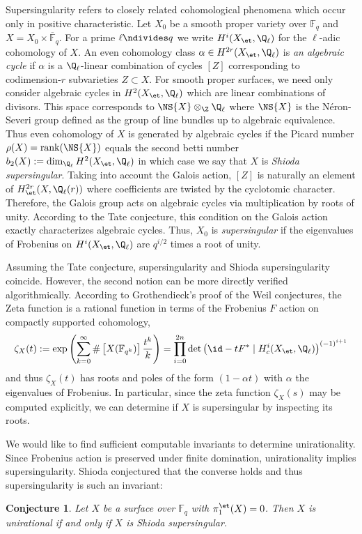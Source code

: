 \documentclass[11pt]{amsart}
\newtheorem*{conj}{Conjecture}
\begin{document}
Supersingularity refers to closely related cohomological phenomena which occur only in positive characteristic. Let $X_0$ be a smooth proper variety over $\mathbb{F}_q$ and $X = X_0 \times \overline{\mathbb{F}}_q$. For a prime $\ell \ndivides q$ we write $H^{i}(X_{\et}, \Q_\ell)$ for the $\ell$-adic \etale cohomology of $X$. An even cohomology class $\alpha \in H^{2r}(X_{\et}, \Q_\ell)$ is \textit{an algebraic cycle} if $\alpha$ is a $\Q_\ell$-linear combination of cycles $[Z]$ corresponding to codimension-$r$ subvarieties $Z \subset X$. For smooth proper surfaces, we need only consider algebraic cycles in $H^2(X_{\et}, \Q_\ell)$ which are linear combinations of divisors. This space corresponds to $\NS{X} \otimes_\Z \Q_\ell$ where $\NS{X}$ is the N\'{e}ron-Severi group defined as the group of line bundles up to algebraic equivalence. Thus even cohomology of $X$ is generated by algebraic cycles if the Picard number $\rho(X) = \mathrm{rank}(\NS{X})$ equals the second betti number $b_2(X) := \dim_{\Q_\ell} H^2(X_{\et}, \Q_\ell)$ in which case we say that $X$ is \textit{Shioda supersingular}.
Taking into account the Galois action, $[Z]$ is naturally an element of $H^{2r}_{\et}(X, \Q_\ell(r))$ where coefficients are twisted by the cyclotomic character. Therefore, the Galois group acts on algebraic cycles via multiplication by roots of unity. According to the Tate conjecture, this condition on the Galois action exactly characterizes algebraic cycles. Thus, $X_0$ is \textit{supersingular} if the eigenvalues of Frobenius on $H^{i}(X_{\et}, \Q_\ell)$ are $q^{i/2}$ times a root of unity.
\par
Assuming the Tate conjecture, supersingularity and Shioda supersingularity coincide.
However, the second notion can be more directly verified algorithmically. According to Grothendieck's proof of the Weil conjectures, the Zeta function is a rational function in terms of the Frobenius $F$ action on compactly supported \etale cohomology,
\[ \zeta_X(t) := \exp{ \left( \sum_{k = 0}^\infty \# \left[ X(\mathbb{F}_{q^k}) \right] \frac{t^k}{k} \right)} = \prod_{i = 0}^{2n} \det{\left( \id - t F^* \mid H^{i}_c(X_{\et}, \Q_\ell) \right)}^{(-1)^{i + 1}} \]
and thus $\zeta_X(t)$ has roots and poles of the form $(1 - \alpha t)$ with $\alpha$ the eigenvalues of Frobenius. In particular, since the zeta function $\zeta_X(s)$ may be computed explicitly, we can determine if $X$ is supersingular by inspecting its roots.
\par
We would like to find sufficient computable invariants to determine unirationality. Since Frobenius action is preserved under finite domination, unirationality implies supersingularity. Shioda conjectured \cite{shioda_some_results} that the converse holds and thus supersingularity is such an invariant:
\begin{conj}
Let $X$ be a surface over $\mathbb{F}_q$ with $\pi_1^{\et}(X) = 0$. Then $X$ is unirational if and only if $X$ is Shioda supersingular.
\end{conj}
\end{document}
